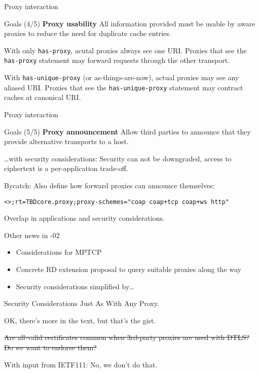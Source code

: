 \documentclass[aspectratio=169]{beamer}
\begin{document}
\begin{frame}{Proxy interaction}\large
	\begin{block}{Goals (4/5)}
		\textbf{Proxy usability} All information provided must be usable by aware proxies to reduce the need for duplicate cache entries.
	\end{block}

	\bigskip

	With only \texttt{has-proxy}, acutal proxies always see one URI.
	Proxies that see the \texttt{has-proxy} statement may forward requests through the other transport.

	\bigskip

	With \texttt{has-unique-proxy} (or as-things-are-now), actual proxies may see any aliased URI.
	Proxies that see the \texttt{has-unique-proxy} statement may contract caches at canonical URI.
\end{frame}

\begin{frame}{Proxy interaction}\large
	\begin{block}{Goals (5/5)}
		\textbf{Proxy announcement} Allow third parties to announce that they provide alternative transports to a host.
	\end{block}

	\ldots with security considerations:
	Security can not be downgraded,
	access to ciphertext is a per-application trade-off.

	\bigskip

	Bycatch: Also define how forward proxies can announce themselves:

	\texttt{<>;rt=TBDcore.proxy;proxy-schemes="coap coap+tcp coap+ws http"}

	Overlap in applications and security considerations.
\end{frame}

\begin{frame}{Other news in -02}\Large
	\begin{itemize}
		\item Considerations for MPTCP
		\item Concrete RD extension proposal to query suitable proxies along the way
		\item Security considerations simplified by\ldots
	\end{itemize}
\end{frame}

\begin{frame}{Security Considerations}
	\color{gray}
	\Huge Just As With Any Proxy.

	\bigskip

	\footnotesize OK, there's more in the text, but that's the gist.

	\vspace{3cm}

	\color{black}

	\sout{Are all-valid certificates common when 3rd-party proxies are used with DTLS? Do we want to endorse them?}

	With input from IETF111: No, we don't do that.
\end{frame}
\end{document}

